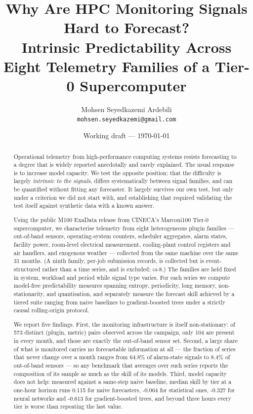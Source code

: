 \documentclass[11pt,a4paper]{article}
\title{Why Are HPC Monitoring Signals Hard to Forecast?\\
       \large Intrinsic Predictability Across Eight Telemetry Families
       of a Tier-0 Supercomputer}
\author{Mohsen Seyedkazemi Ardebili\\
        \small \texttt{mohsen.seyedkazemi@gmail.com}}
\date{Working draft --- \today}
\newcommand{\num}[1]{#1}
\newcommand{\oi}[1]{\textsc{oi-#1}}
\begin{document}
\maketitle

\begin{abstract}
Operational telemetry from high-performance computing systems resists
forecasting to a degree that is widely reported anecdotally and rarely
explained. The usual response is to increase model capacity. We test the
opposite position: that the difficulty is largely \emph{intrinsic to the
signals}, differs systematically between signal families, and can be quantified
without fitting any forecaster. It largely survives our own test, but only under
a criterion we did not start with, and establishing that required validating the
test itself against synthetic data with a known answer.

Using the public M100 ExaData release from CINECA's Marconi100 Tier-0
supercomputer, we characterise telemetry from eight heterogeneous plugin
families --- out-of-band sensors, operating-system counters, scheduler
aggregates, alarm states, facility power, room-level electrical measurement,
cooling-plant control registers and air handlers, and exogenous weather ---
collected from the same machine over the same 31 months. (A ninth family,
per-job submission records, is collected but is event-structured rather than a
time series, and is excluded; \oi{8}.) The families are held
fixed in system, workload and period while signal type varies.
For each series we compute model-free predictability measures spanning entropy,
periodicity, long memory, non-stationarity, and quantisation, and separately
measure the forecast skill achieved by a tiered suite ranging from naive
baselines to gradient-boosted trees under a strictly causal rolling-origin
protocol.

We report five findings. First, the monitoring infrastructure is itself
non-stationary: of \num{573} distinct (plugin, metric) pairs observed across the
campaign, only \num{104} are present in every month, and those are exactly the
out-of-band sensor set. Second, a large share of what is monitored carries no
forecastable information at all --- the fraction of series that never change
over a month ranges from \num{64.8}\% of alarm-state signals to \num{8.4}\% of
out-of-band sensors --- so any benchmark that averages over such series reports
the composition of its sample as much as the skill of its models. Third, model
capacity does not help: measured against a same-step naive baseline, median
skill by tier at a one-hour horizon runs \num{0.115} for naive forecasters,
\num{-0.064} for statistical ones, \num{-0.327} for neural networks and
\num{-0.613} for gradient-boosted trees, and beyond three hours every tier is
worse than repeating the last value.


\end{abstract}
\end{document}
